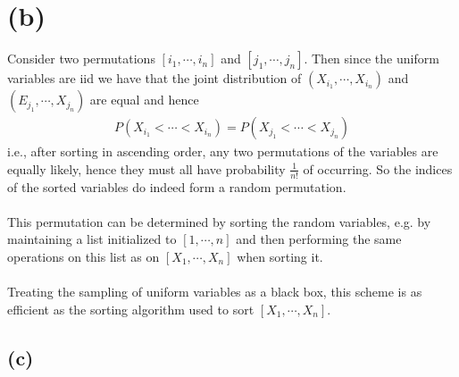 \documentclass[11pt]{article}
\begin{document}
\section*{(b)}
Consider two permutations $\left[ i_1,\cdots,i_n \right]$ and $\left[ j_1,\cdots,j_n \right]$.
Then since the uniform variables are iid we have that the joint distribution of
$\left( X_{i_1},\cdots, X_{i_n} \right)$ and
$\left( E_{j_1},\cdots,X_{j_n} \right)$
are equal and hence
\begin{align*}
	P\left( X_{i_1}<\cdots<X_{i_n} \right)=P\left( X_{j_1}<\cdots<X_{j_n} \right)
\end{align*}
i.e., after sorting in ascending order, any two permutations of the variables are equally likely, 
hence they must all have probability $\frac{1}{n!}$ of occurring. 
So the indices of the sorted variables do indeed form a random permutation. \\ \\
This permutation can be determined by sorting the random variables, 
e.g. by maintaining a list initialized to $\left[ 1,\cdots,n \right]$ 
and then performing the same operations on this list as on $\left[ X_1,\cdots,X_n \right]$ 
when sorting it. \\ \\
Treating the sampling of uniform variables as a black box,
this scheme is as efficient as the sorting algorithm used to sort $\left[ X_1,\cdots,X_n \right]$.
\subsection*{(c)}
\end{document}
